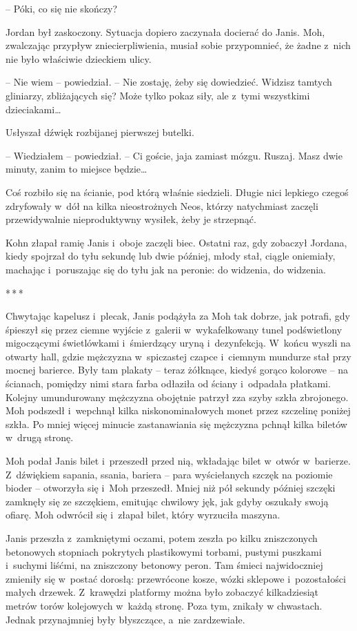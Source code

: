 \documentclass[oneside,polish,11pt,sfheadings]{mwbk}
\newcommand{\threeast}{\bigskip\par\centerline{*\,*\,*}\medskip\par}%
\begin{document}
-- Póki, co się nie skończy?

Jordan był zaskoczony. Sytuacja dopiero zaczynała docierać do Janis.
Moh, zwalczając przypływ zniecierpliwienia, musiał sobie przypomnieć, że
żadne z~nich nie było właściwie dzieckiem ulicy.

-- Nie wiem -- powiedział. -- Nie zostaję, żeby się dowiedzieć. Widzisz
tamtych gliniarzy, zbliżających się? Może tylko pokaz siły, ale z~tymi
wszystkimi dzieciakami\ldots

Usłyszał dźwięk rozbijanej pierwszej butelki.

-- Wiedziałem -- powiedział. -- Ci goście, jaja zamiast mózgu. Ruszaj. Masz
dwie minuty, zanim to miejsce będzie\ldots

Coś rozbiło się na ścianie, pod którą właśnie siedzieli. Długie nici
lepkiego czegoś zdryfowały w~dół na kilka nieostrożnych Neos, którzy
natychmiast zaczęli przewidywalnie nieproduktywny wysiłek, żeby je
strzepnąć.

Kohn złapał ramię Janis i~oboje zaczęli biec. Ostatni raz, gdy zobaczył
Jordana, kiedy spojrzał do tyłu sekundę lub dwie później, młody stał,
ciągle oniemiały, machając i~poruszając się do tyłu jak na peronie: do
widzenia, do widzenia.

  \threeast 

Chwytając kapelusz i~plecak, Janis podążyła za Moh tak dobrze, jak
potrafi, gdy śpieszył się przez ciemne wyjście z~galerii w~wykafelkowany
tunel podświetlony migoczącymi świetlówkami i~śmierdzący uryną i~dezynfekcją. W~końcu wyszli na otwarty hall, gdzie mężczyzna w~spiczastej
czapce i~ciemnym mundurze stał przy mocnej barierce. Były tam plakaty -- teraz żółknące, kiedyś gorąco kolorowe -- na ścianach, pomiędzy nimi
stara farba odłaziła od ściany i~odpadała płatkami. Kolejny umundurowany
mężczyzna obojętnie patrzył zza szyby szkła zbrojonego. Moh podszedł i~wepchnął kilka niskonominałowych monet przez szczelinę poniżej szkła. Po
mniej więcej minucie zastanawiania się mężczyzna pchnął kilka biletów w~drugą stronę.

Moh podał Janis bilet i~przeszedł przed nią, wkładając bilet w~otwór w~barierze. Z~dźwiękiem sapania, ssania, bariera -- para wyściełanych
szczęk na poziomie bioder -- otworzyła się i~Moh przeszedł. Mniej niż pół
sekundy później szczęki zamknęły się ze szczękiem, emitując chwilowy
jęk, jak gdyby oszukały swoją ofiarę. Moh odwrócił się i~złapał bilet,
który wyrzuciła maszyna.

Janis przeszła z~zamkniętymi oczami, potem zeszła po kilku zniszczonych
betonowych stopniach pokrytych plastikowymi torbami, pustymi puszkami i~suchymi liśćmi, na zniszczony betonowy peron. Tam śmieci najwidoczniej
zmieniły się w~postać dorosłą: przewrócone kosze, wózki sklepowe i~pozostałości małych drzewek. Z~krawędzi platformy można było zobaczyć
kilkadziesiąt metrów torów kolejowych w~każdą stronę. Poza tym, znikały
w chwastach. Jednak przynajmniej były błyszczące, a~nie zardzewiałe.
\end{document}
